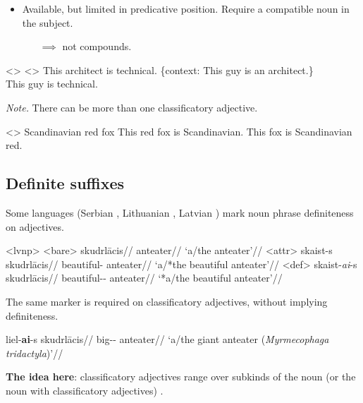 \documentclass[a4paper,12pt]{article}
\begin{document}
\begin{itemize}
    \item Available, but limited in predicative position. Require a compatible noun in the subject.
    \begin{itemize}
        \item[$\implies$] not compounds.
    \end{itemize}
\end{itemize}

\pex<>
    \a<> This architect is technical.
    \a \{context: This guy is an architect.\}\\\ljudge*This guy is technical.
\xe

\emph{Note.} There can be more than one classificatory adjective.

\pex<>
    \a Scandinavian red fox
    \a This red fox is Scandinavian.
    \a \ljudge*This fox is Scandinavian red.
\xe


\subsection{Definite suffixes}

Some languages (Serbian \parencite{rutkowski2005classificationprojectionpolish}, Lithuanian \parencite{rutkowski2006classifyingadjectivesnoun,holvoet2012semanticmapdefinite}, Latvian \parencite{holvoet2012semanticmapdefinite}) mark noun phrase definiteness on adjectives.

\pex<lvnp>
\a<bare> \begingl
        \gla skudrlācis//
        \glb anteater//
        \glft `a/the anteater'//
    \endgl
    \a<attr> \begingl
        \gla skaist-s skudrlācis//
        \glb beautiful-\Nom{} anteater//
        \glft `a/*the beautiful anteater'//
    \endgl
    \a<def> \begingl
        \gla skaist-\emph{ai}-s skudrlācis//
        \glb beautiful-\Def-\Nom{} anteater//
        \glft `*a/the beautiful anteater'//
    \endgl
\xe
        
The same marker is required on classificatory adjectives, without implying definiteness.
        
\ex
    \begingl
        \gla liel-\textbf{ai}-s skudrlācis//
        \glb big-\Def-\Nom{} anteater//
        \glft `a/the giant anteater (\textit{Myrmecophaga tridactyla})'//
    \endgl
\xe
        
\textbf{The idea here}: classificatory adjectives range over subkinds of the noun (or the noun with classificatory adjectives) \parencite[cf.][]{mcnally2004relationaladjectivesproperties}.
\end{document}
